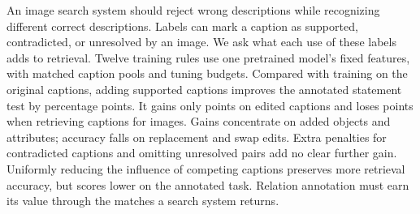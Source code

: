 An image search system should reject wrong descriptions while recognizing different correct descriptions. Labels can mark a caption as supported, contradicted, or unresolved by an image. We ask what each use of these labels adds to retrieval. Twelve training rules use one pretrained model's fixed features, with matched caption pools and tuning budgets. Compared with training on the original captions, adding supported captions improves the annotated statement test by \PositiveRelationGain{} percentage points. It gains only \PositiveSugarGain{} points on edited captions and loses \PositiveRetrievalLoss{} points when retrieving captions for images. Gains concentrate on added objects and attributes; accuracy falls on replacement and swap edits. Extra penalties for contradicted captions and omitting unresolved pairs add no clear further gain. Uniformly reducing the influence of competing captions preserves more retrieval accuracy, but scores lower on the annotated task. Relation annotation must earn its value through the matches a search system returns.
